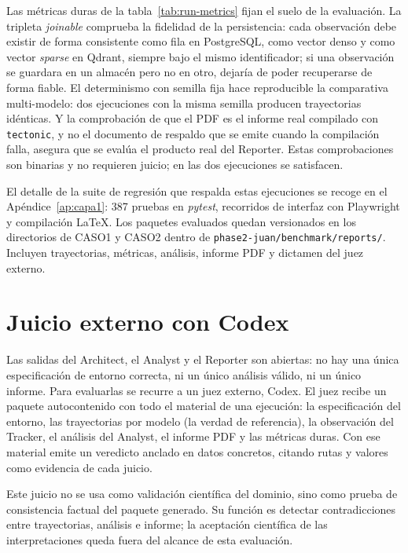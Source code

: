 Las métricas duras de la tabla~\ref{tab:run-metrics} fijan el suelo de la
evaluación. La tripleta \textit{joinable} comprueba la fidelidad de la
persistencia: cada observación debe existir de forma consistente como fila en
PostgreSQL, como vector denso y como vector \textit{sparse} en Qdrant, siempre
bajo el mismo identificador; si una observación se guardara en un almacén pero no
en otro, dejaría de poder recuperarse de forma fiable. El determinismo
con semilla fija hace reproducible la comparativa multi-modelo: dos
ejecuciones con la misma semilla producen trayectorias idénticas. Y la
comprobación de que el PDF es el informe real compilado con
\texttt{tectonic}, y no el documento de respaldo que se emite cuando la
compilación falla, asegura que se evalúa el producto real del Reporter. Estas
comprobaciones son binarias y no requieren juicio; en las dos ejecuciones se
satisfacen.

El detalle de la suite de regresión que respalda estas ejecuciones se recoge en
el Apéndice~\ref{ap:capa1}: 387 pruebas en \textit{pytest}, recorridos de
interfaz con Playwright y compilación LaTeX.
Los paquetes evaluados quedan versionados en los directorios de CASO1 y CASO2
dentro de \texttt{phase2-juan/\allowbreak benchmark/\allowbreak reports/}.
Incluyen trayectorias,
métricas, análisis, informe PDF y dictamen del juez externo.

\section{Juicio externo con Codex}

Las salidas del Architect, el Analyst y el Reporter son abiertas: no hay una
única especificación de entorno correcta, ni un único análisis válido, ni un
único informe. Para evaluarlas se recurre a un juez externo, Codex. El juez
recibe un paquete autocontenido con todo el material de
una ejecución: la especificación del entorno, las trayectorias por modelo (la
verdad de referencia), la observación del Tracker, el análisis del Analyst, el
informe PDF y las métricas duras. Con ese material emite un veredicto anclado en
datos concretos, citando rutas y valores como evidencia de cada juicio.

Este juicio no se usa como validación científica del dominio, sino como prueba
de consistencia factual del paquete generado. Su función es detectar
contradicciones entre trayectorias, análisis e informe; la aceptación científica
de las interpretaciones queda fuera del alcance de esta evaluación.

